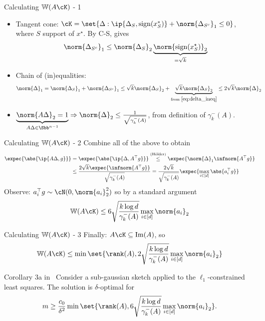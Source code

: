 \documentclass[10pt]{beamer}
\newcommand{\xstar}{x^{\star}}
\begin{document}
\begin{frame}{Calculating $\mathbb{W}(A \cK)$ - 1}
    \begin{itemize}
        \item
        Tangent cone: $\cK = \set{\Delta : \ip{\Delta_S,
        \mathrm{sign}(x^*_S)} + \norm{\Delta_{S^c}}_1 \leq 0}$,
        where $S$ support of $\xstar$. By C-S, gives
        \begin{equation}
            \norm{\Delta_{S^c}}_1 \leq \norm{\Delta_S}_2
            \underbrace{\norm{\mathrm{sign}(\xstar_S)}_2}_{= \sqrt{k}}
            \label{eq:delta_ineq}
        \end{equation}

        \item Chain of (in)equalities:
        \begin{align*}
            \norm{\Delta}_1 &= \norm{\Delta_S}_1 + \norm{\Delta_{S^c}}_1
            \leq \sqrt{k} \norm{\Delta_S}_2 +
            \underbrace{\sqrt{k} \norm{\Delta_{S}}_2}_{
                \text{from } \eqref{eq:delta_ineq}}
            \leq 2 \sqrt{k} \norm{\Delta}_2
        \end{align*}
        \item $\underbrace{\norm{A \Delta}_2 = 1}_{A \Delta \in \Sbb^{n-1}}
        \Rightarrow
            \norm{\Delta}_2 \leq \frac{1}{\sqrt{\gamma_{k}^-(A)}}$,
            from definition of $\gamma_k^-(A)$.
    \end{itemize}
\end{frame}
\begin{frame}{Calculating $\mathbb{W}(A \cK)$ - 2}
    Combine all of the above to obtain
    \begin{align*}
        \expec{\abs{\ip{A \Delta, g}}} &= \expec{\abs{\ip{\Delta, A^\top g}}}
        \overset{(\text{H{\"o}lder})}{\leq}
        \expec{\norm{\Delta}_1
        \infnorm{A^\top g}} \\
        & \leq \frac{2 \sqrt{k} \expec{\infnorm{A^\top g}}}{
        \sqrt{\gamma_k^-(A)}} =
        \frac{2 \sqrt{k}}{\sqrt{\gamma_k^-(A)}}
        \expec{\max_{i \in [d]} \abs{a_i^\top g}}
    \end{align*}
    Observe: $a_i^\top g \sim \cN(0, \norm{a_i}_2^2)$ so by a standard
    argument~\cite[Eq. (3.13)]{LedTal13}
    \[
        \mathbb{W}(A \cK) \leq 6 \sqrt{\frac{k \log d}{\gamma_k^-(A)}}
        \max_{i \in [d]} \norm{a_i}_2
    \]
\end{frame}

\begin{frame}{Calculating $\mathbb{W}(A \cK)$ - 3}
    Finally: $A \cK \subseteq \mathrm{Im}(A)$, so
    \[
        \mathbb{W}(A\cK) \leq \min\set{\rank(A),
        2 \sqrt{\frac{k \log d}{\gamma_k^-(A)}} \max_{i \in [d]} \norm{a_i}_2}
    \]
    \begin{block}{Corollary 3a in~\cite{PilWain15}}
        Consider a sub-gaussian sketch applied to the $\ell_1$-constrained
        least squares. The solution is $\delta$-optimal for
        \[
            m \geq \frac{c_0}{\delta^2} \min\set{\rank(A),
            6 \sqrt{\frac{k \log d}{\gamma_k^-(A)}} \max_{i \in [d]}
            \norm{a_i}_2}.
        \]
    \end{block}
\end{frame}
\end{document}

